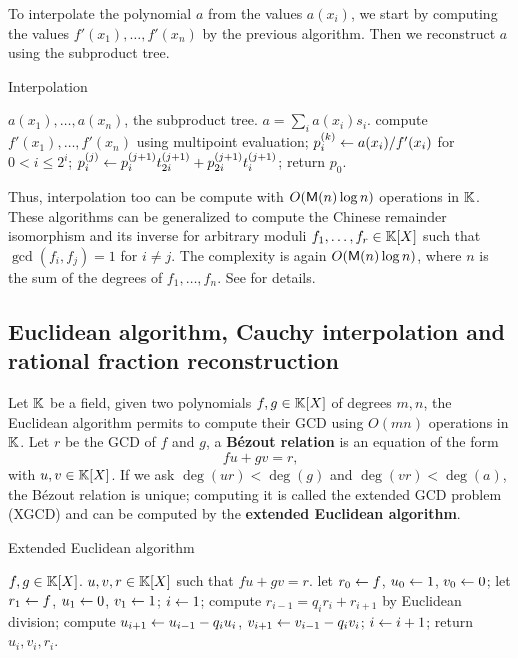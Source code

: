 To interpolate the polynomial $a$ from the values $a(x_i)$, we start
by computing the values $f'(x_1),\ldots,f'(x_n)$ by the previous
algorithm. Then we reconstruct $a$ using the subproduct tree.

\begin{algorithm}
  \caption{\label{alg:interp}Interpolation}
  \begin{algorithmic}[1]
    \REQUIRE $a(x_1),\ldots,a(x_n)$, the subproduct tree.
    \ENSURE $a=\sum_i a(x_i)s_i$.
    \STATE compute $f'(x_1),\ldots,f'(x_n)$ using multipoint evaluation;
    \STATE $p_i^{(k)}\leftarrow a(x_i)/f'(x_i)$ for $0<i\le2^i$;
    \STATE $p_i^{(j)} \leftarrow p_i^{(j+1)}t_{2i}^{(j+1)} + p_{2i}^{(j+1)}t_{i}^{(j+1)}$;
    \ENDFOR
    \ENDFOR
    \STATE return $p_0$.
  \end{algorithmic}
\end{algorithm}

Thus, interpolation too can be compute with $O(\mathsf{M}(n)\log n)$
operations in $\mathbb{K}$. These algorithms can be generalized to compute the
Chinese remainder isomorphism and its inverse for arbitrary moduli
$f_1,\ldots,f_r\in\mathbb{K}[X]$ such that $\gcd(f_i,f_j)=1$ for $i\ne j$. The
complexity is again $O(\mathsf{M}(n)\log n)$, where $n$ is the sum of the
degrees of $f_1,\ldots,f_n$. See \cite[$\S10$]{vzGG} for details.



\subsection[XGCD, Cauchy interpolation and RFR]{Euclidean algorithm,
  Cauchy interpolation and rational fraction reconstruction}
\label{sec:eucl-algor-rati}
Let $\mathbb{K}$ be a field, given two polynomials $f,g\in\mathbb{K}[X]$ of degrees
$m,n$, the Euclidean algorithm permits to
compute their GCD using $O(mn)$ operations in $\mathbb{K}$. Let $r$
be the GCD of $f$ and $g$, a \textbf{Bézout
  relation} is an equation of the form
\begin{equation}
  \label{eq:154}
  fu + gv = r
  \text{,}
\end{equation}
with $u,v\in\mathbb{K}[X]$. If we ask $\deg(ur)<\deg(g)$ and
$\deg(vr)<\deg(a)$, the Bézout relation is unique; computing it is
called the extended GCD problem (XGCD) and can be computed
by the \textbf{extended Euclidean
  algorithm}.

\begin{algorithm}
  \caption{Extended Euclidean algorithm}
  \begin{algorithmic}[1]
    \REQUIRE $f,g\in\mathbb{K}[X]$.
    \ENSURE $u,v,r\in\mathbb{K}[X]$ such that $fu+gv=r$.
    \STATE let $r_0\leftarrow f$, $u_0\leftarrow1$, $v_0\leftarrow0$;
    \STATE let $r_1\leftarrow f$, $u_1\leftarrow0$, $v_1\leftarrow1$;
    \STATE $i\leftarrow1$;
    \STATE compute $r_{i-1} = q_ir_i + r_{i+1}$ by Euclidean division;
    \STATE compute $u_{i+1} \leftarrow u_{i-1} - q_iu_i$, $v_{i+1} \leftarrow v_{i-1} - q_iv_i$;
    \STATE $i\leftarrow i+1$;
    \ENDWHILE
    \STATE return $u_i,v_i,r_i$.
  \end{algorithmic}
\end{algorithm}

